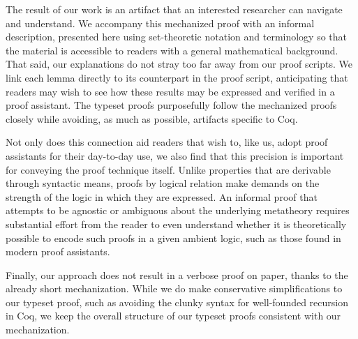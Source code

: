 \documentclass[acmsmall,screen=true,
\ifpublic review=false\else,review=true\fi
  ,anonymous=\ifanonymous true\else false\fi]{acmart}
\begin{document}
The result of our work is an artifact that an interested researcher can
navigate and understand. We accompany this mechanized proof with an informal
description, presented here using set-theoretic notation and terminology so
that the material is accessible to readers with a general mathematical
background.  That said, our explanations do not stray too far away from our
proof scripts.  We link each lemma directly to its counterpart in the proof
script, anticipating that readers may wish to see how these results may be
expressed and verified in a proof assistant.  The typeset proofs purposefully
follow the mechanized proofs closely while avoiding, as much as possible,
artifacts specific to Coq.

Not only does this connection aid readers that wish to, like us, adopt proof
assistants for their day-to-day use, we also find that this precision is
important for conveying the proof technique itself. Unlike properties that are
derivable through syntactic means, proofs by logical relation make demands on
the strength of the logic in which they are expressed. An informal proof that
attempts to be agnostic or ambiguous about the underlying metatheory requires
substantial effort from the reader to even understand whether it is
theoretically possible to encode such proofs in a given ambient logic, such as
those found in modern proof assistants.

Finally, our approach does not result in a verbose proof on paper, thanks to
the already short mechanization. While we do make conservative simplifications
to our typeset proof, such as avoiding the clunky syntax for well-founded
recursion in Coq, we keep the overall structure of our typeset proofs
consistent with our mechanization.









\end{document}

